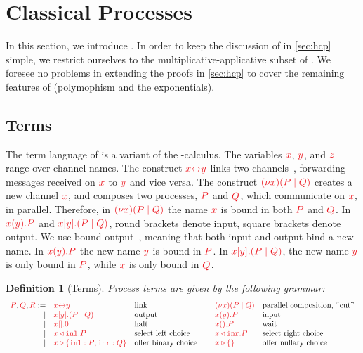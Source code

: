 \documentclass[submission,copyright,creativecommons]{eptcs}
\newtheorem{definition}[lemma]{Definition}
\begin{document}
\section{Classical Processes}
\label{sec:cp}

In this section, we introduce \cp. In order to keep the discussion of \hcp in \cref{sec:hcp} simple, we restrict ourselves to the multiplicative-applicative subset of \cp. We foresee no problems in extending the proofs in \cref{sec:hcp} to cover the remaining features of \cp (polymophism and the exponentials).

\subsection{Terms}
The term language of \cp is a variant of the \textpi-calculus. The variables $\tm{x}$, $\tm{y}$, and $\tm{z}$ range over channel names. The construct $\tm{\cpLink{x}{y}}$ links two channels~\citep{sangiorgi1996,boreale1998}, forwarding messages received on $\tm{x}$ to $\tm{y}$ and vice versa. The construct $\tm{\cpCut{x}{P}{Q}}$ creates a new channel $\tm{x}$, and composes two processes, $\tm{P}$ and $\tm{Q}$, which communicate on $\tm{x}$, in parallel. Therefore, in $\tm{\cpCut{x}{P}{Q}}$ the name $\tm{x}$ is bound in both $\tm{P}$ and $\tm{Q}$. In $\tm{\cpRecv{x}{y}{P}}$ and $\tm{\cpSend{x}{y}{P}{Q}}$, round brackets denote input, square brackets denote output. We use bound output~\citep{sangiorgi1996}, meaning that both input and output bind a new name. In $\tm{\cpRecv{x}{y}{P}}$ the new name $\tm{y}$ is bound in $\tm{P}$. In $\tm{\cpSend{x}{y}{P}{Q}}$, the new name $\tm{y}$ is only bound in $\tm{P}$, while $\tm{x}$ is only bound in $\tm{Q}$.
\begin{definition}[Terms]\label{def:cp-terms}
  Process terms are given by the following grammar:
  \[
    \begin{array}{rllrll}
      \tm{P}, \tm{Q}, \tm{R}
           :=& \tm{\cpLink{x}{y}}       &\text{link}
      &  \mid& \tm{\cpCut{x}{P}{Q}}     &\text{parallel composition, ``cut''}
      \\ \mid& \tm{\cpSend{x}{y}{P}{Q}} &\text{output}
      &  \mid& \tm{\cpRecv{x}{y}{P}}    &\text{input}
      \\ \mid& \tm{\cpHalt{x}}          &\text{halt}
      &  \mid& \tm{\cpWait{x}{P}}       &\text{wait}
      \\ \mid& \tm{\cpInl{x}{P}}        &\text{select left choice}
      &  \mid& \tm{\cpInr{x}{P}}        &\text{select right choice}
      \\ \mid& \tm{\cpCase{x}{P}{Q}}    &\text{offer binary choice}
      &  \mid& \tm{\cpAbsurd{x}}        &\text{offer nullary choice}
    \end{array}
  \]
\end{definition}\noindent
\end{document}
